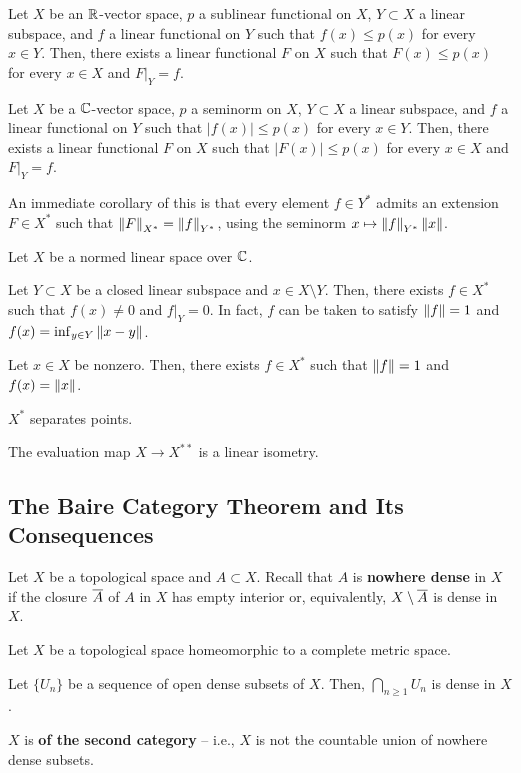 \documentclass[11pt]{article}
\begin{document}
\begin{theorem}
Let $X$ be an $\mathbb{R}$-vector space, $p$ a sublinear functional on $X$, $Y\subset X$ a linear subspace, and $f$ a linear functional on $Y$ such that $f(x)\leq p(x)$ for every $x\in Y$. Then, there exists a linear functional $F$ on $X$ such that $F(x)\leq p(x)$ for every $x\in X$ and $F|_Y=f$.
\end{theorem}

\begin{theorem}
Let $X$ be a $\mathbb{C}$-vector space, $p$ a seminorm on $X$, $Y\subset X$ a linear subspace, and $f$ a linear functional on $Y$ such that $|f(x)|\leq p(x)$ for every $x\in Y$. Then, there exists a linear functional $F$ on $X$ such that $|F(x)|\leq p(x)$ for every $x\in X$ and $F|_Y=f$.
\end{theorem}

An immediate corollary of this is that every element $f\in Y^*$ admits an extension $F\in X^*$ such that $\left\lVert F\right\rVert_{X^*}=\left\lVert f\right\rVert_{Y^*}$, using the seminorm $x\mapsto\left\lVert f\right\rVert_{Y^*}\left\lVert x\right\rVert$.

\begin{theorem}
Let $X$ be a normed linear space over $\mathbb{C}$.
\begin{enum}{\alph}
\item Let $Y\subset X$ be a closed linear subspace and $x\in X\setminus Y$. Then, there exists $f\in X^*$ such that $f(x)\neq0$ and $f|_Y=0$. In fact, $f$ can be taken to satisfy $\left\lVert f\right\rVert=1$ and $f(x)=\inf_{y\in Y}\left\lVert x-y\right\rVert$.
\item Let $x\in X$ be nonzero. Then, there exists $f\in X^*$ such that $\left\lVert f\right\rVert=1$ and $f(x)=\left\lVert x\right\rVert$.
\item $X^*$ separates points.
\item The evaluation map $X\to X^{**}$ is a linear isometry.
\end{enum}
\end{theorem}

\subsection{The Baire Category Theorem and Its Consequences}
Let $X$ be a topological space and $A\subset X$. Recall that $A$ is \textbf{nowhere dense} in $X$ if the closure $\overline{A}$ of $A$ in $X$ has empty interior or, equivalently, $X\setminus\overline{A}$ is dense in $X$.

\begin{theorem}
Let $X$ be a topological space homeomorphic to a complete metric space.
\begin{enum}{\alph}
\item Let $\{U_n\}$ be a sequence of open dense subsets of $X$. Then, $\bigcap_{n\geq1}U_n$ is dense in $X$.
\item $X$ is \textbf{of the second category} -- i.e., $X$ is not the countable union of nowhere dense subsets.
\end{enum}
\end{theorem}
\end{document}
